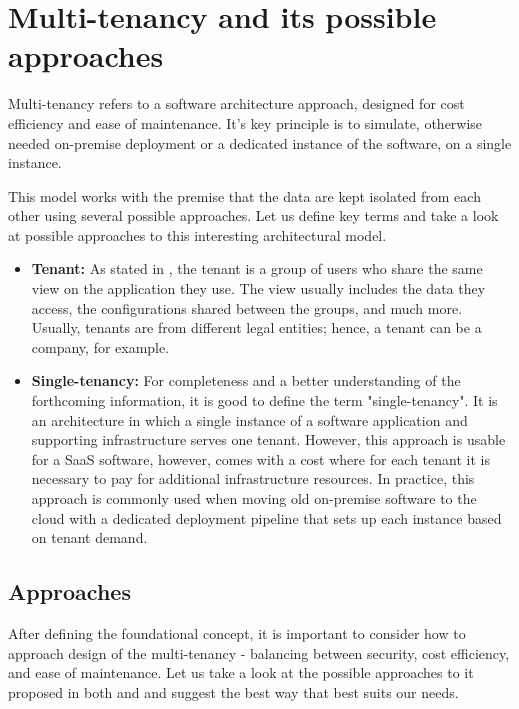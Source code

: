 \section{Multi-tenancy and its possible approaches}
\label{sec:different-approaches-for-multitanency}
Multi-tenancy refers to a software architecture approach, designed for cost efficiency and ease of maintenance.
It's key principle is to simulate, otherwise needed on-premise deployment or a dedicated instance of the software, on a single instance.

This model works with the premise that the data are kept isolated from each other using several possible approaches.
Let us define key terms and take a look at possible approaches to this interesting architectural model.

\begin{itemize}
    \item \textbf{Tenant:} As stated in \cite{MultitennancyArchitecture2012}, the tenant is a group of users who share the same view on the application they use.
    The view usually includes the data they access, the configurations shared between the groups, and much more.
    Usually, tenants are from different legal entities; hence, a tenant can be a company, for example.
    \item \textbf{Single-tenancy:} For completeness and a better understanding of the forthcoming information, it is good to define the term "single-tenancy".
    It is an architecture in which a single instance of a software application and supporting infrastructure serves one tenant.
    However, this approach is usable for a \ac{SaaS} software, however, comes with a cost where for each tenant it is necessary to pay for additional infrastructure resources.
    In practice, this approach is commonly used when moving old on-premise software to the cloud with a dedicated deployment pipeline that sets up each instance based on tenant demand. 
\end{itemize}


\subsection{Approaches}
After defining the foundational concept, it is important to consider how to approach design of the multi-tenancy - balancing between security, cost efficiency, and ease of maintenance.
Let us take a look at the possible approaches to it proposed in both \cite{MultitennancyArchitecture2012} and \cite{MultitenancyArchitectureMedium} and suggest the best way that best suits our needs.

